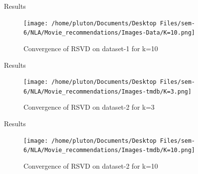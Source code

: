 \documentclass{beamer}
\begin{document}
\begin{frame}{Results}
    \begin{figure}[htp]
    \texttt{[image: /home/pluton/Documents/Desktop Files/sem-6/NLA/Movie\_recommendations/Images-Data/K=10.png]}
    \caption{Convergence of RSVD on dataset-1 for k=10}
    \end{figure}
\end{frame}

\begin{frame}{Results}
    \begin{figure}[htp]
    \texttt{[image: /home/pluton/Documents/Desktop Files/sem-6/NLA/Movie\_recommendations/Images-tmdb/K=3.png]}
    \caption{Convergence of RSVD on dataset-2 for k=3}
    \end{figure}
\end{frame}

\begin{frame}{Results}
    \begin{figure}[htp]
    \texttt{[image: /home/pluton/Documents/Desktop Files/sem-6/NLA/Movie\_recommendations/Images-tmdb/K=10.png]}
    \caption{Convergence of RSVD on dataset-2 for k=10}
    \end{figure}
\end{frame}
\end{document}
